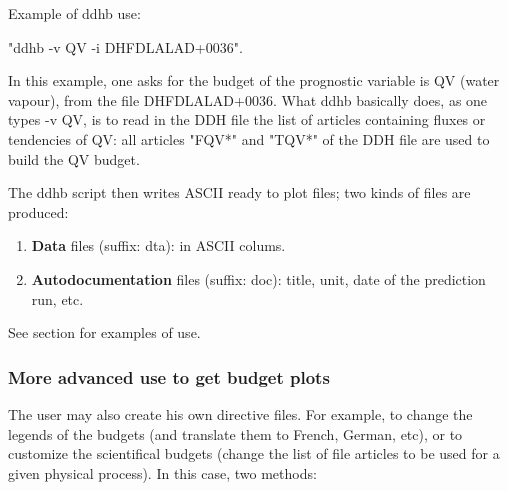 \p Example of ddhb use: 

\p "ddhb -v QV -i DHFDLALAD+0036".

\p In this example, one asks for the budget of the prognostic 
variable is QV (water vapour), from the file DHFDLALAD+0036.
What ddhb basically does, as one types -v QV, is to read in the DDH file the list of articles
containing fluxes or tendencies of QV: all articles "FQV*" and "TQV*" 
of the DDH file are used to build the QV budget.

\p The ddhb script then writes ASCII ready to plot files; two kinds of files are produced:
\begin{enumerate}
  \item {\bf Data} files (suffix: dta): in ASCII colums.
  \item {\bf Autodocumentation} files (suffix: doc): title, unit, date of the prediction run, etc.
\end{enumerate}

\p See section  for examples of use.

\subsubsection{More advanced use to get budget plots}

\p The user may also create his own directive files. For example, to change the legends 
of the budgets (and translate
them to French, German, etc), or to customize the scientifical budgets (change the list
of file articles to be used for a given physical process). In this case, two methods:

